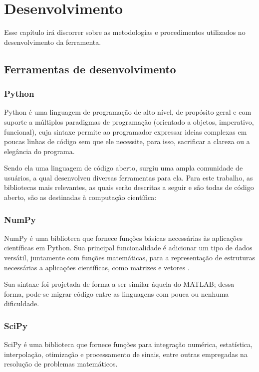 \chapter{Desenvolvimento}

Esse capítulo irá discorrer sobre as metodologias e procedimentos utilizados no desenvolvimento da ferramenta.

\section{Ferramentas de desenvolvimento}

\subsection{Python}

Python \cite{pythondoc} é uma linguagem de programação de alto nível, de propósito geral e com suporte a múltiplos paradigmas de programação (orientado a objetos, imperativo, funcional), cuja sintaxe permite ao programador expressar ideias complexas em poucas linhas de código sem que ele necessite, para isso, sacrificar a clareza ou a elegância do programa. 

Sendo ela uma linguagem de código aberto, surgiu uma ampla comunidade de usuários, a qual desenvolveu diversas ferramentas para ela. Para este trabalho, as bibliotecas mais relevantes, as quais serão descritas a seguir e são todas de código aberto, são as destinadas à computação científica:

\subsection{NumPy}
NumPy é uma biblioteca que fornece funções básicas necessárias às aplicações científicas em Python. Sua principal funcionalidade é adicionar um tipo de dados versátil, juntamente com funções matemáticas, para a representação de estruturas necessárias a aplicações científicas, como matrizes e vetores \cite{numpydoc}. 

Sua sintaxe foi projetada de forma a ser similar àquela do MATLAB; dessa forma, pode-se migrar código entre as linguagens com pouca ou nenhuma dificuldade.

\subsection{SciPy}
SciPy é uma biblioteca que fornece funções para integração numérica, estatística, interpolação, otimização e processamento de sinais, entre outras empregadas na resolução de problemas matemáticos.

